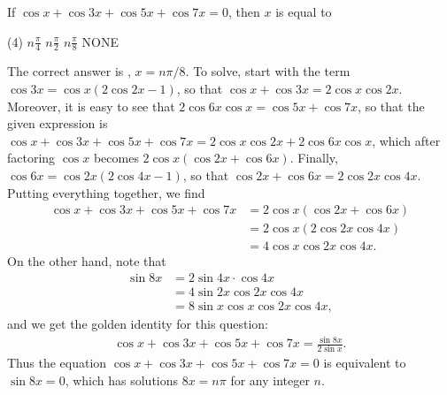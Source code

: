 \documentclass[12pt,a4paper]{memoir}
\theoremstyle{definition}
\newcommand{\correct}{
    \PrintSolutionsTF{%
        \ref{ans:\CurrentQuestionID}%
        }{%
        \label{ans:\CurrentQuestionID}%
        }%
}
\begin{document}
\begin{question}
	If $\cos x + \cos 3x + \cos 5x + \cos 7x = 0$, then $x$ is equal to
	\begin{tasks}(4)
		\task $\displaystyle n\frac{\pi}{4}$
		\task $\displaystyle n\frac{\pi}{2}$
		\task \correct $\displaystyle n\frac{\pi}{8}$
		\task NONE
	\end{tasks}
\end{question}
\begin{solution}
	The correct answer is \correct, $x=n\pi/8$. To solve, start with the term $\cos 3x = \cos x (2\cos 2x-1)$, so that $\cos x + \cos 3x = 2 \cos x \cos 2x$. Moreover, 
	it is easy to see that $2 \cos 6x \cos x= \cos 5x+ \cos 7x$, so that the given expression is $\cos x + \cos 3x + \cos 5x + \cos 7x = 2 \cos x \cos 2x + 2 \cos 6x \cos x$, which after factoring $\cos x$ becomes $2\cos x(\cos 2x + \cos 6x)$. Finally, $\cos 6x = \cos 2x (2\cos 4x-1)$, so that $\cos 2x + \cos 6x = 2 \cos 2x \cos 4x$. Putting everything together, we find
	\begin{align*}
		\cos x + \cos 3x + \cos 5x + \cos 7x &= 2\cos x(\cos 2x + \cos 6x)\\
		&= 2\cos x(2 \cos 2x \cos 4x)\\
		&= 4 \cos x \cos 2x \cos 4x.
	\end{align*}
	On the other hand, note that
	\begin{align*}
		\sin 8x &= 2 \sin 4x \cdot \cos 4x\\
		&= 4 \sin 2x \cos 2x \cos 4x \\
		&= 8\sin x \cos x \cos 2x \cos 4x,
	\end{align*}
	and we get the golden identity for this question:
	\begin{align*}
		\cos x + \cos 3x + \cos 5x + \cos 7x = \frac{\sin 8x}{2\sin x}.
	\end{align*}
	Thus the equation $\cos x + \cos 3x + \cos 5x + \cos 7x = 0$ is equivalent to $\sin 8x = 0$, which has solutions $8x = n\pi$ for any integer $n$.
\end{solution}
\end{document}
